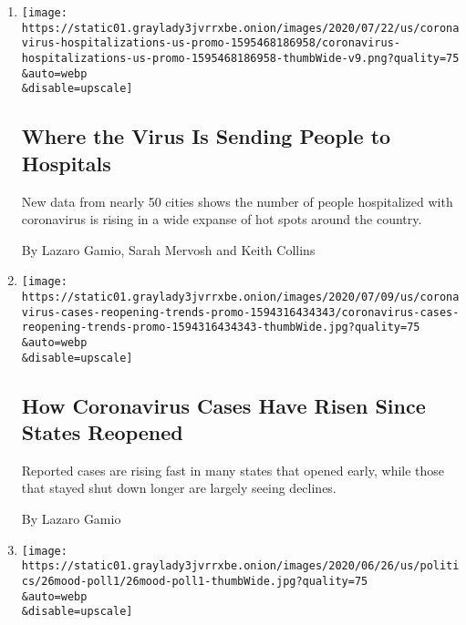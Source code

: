 \begin{enumerate}
\def\labelenumi{\arabic{enumi}.}
\item
  \href{/interactive/2020/07/23/us/coronavirus-hospitalizations-us.html}{}

  \texttt{[image: https://static01.graylady3jvrrxbe.onion/images/2020/07/22/us/coronavirus-hospitalizations-us-promo-1595468186958/coronavirus-hospitalizations-us-promo-1595468186958-thumbWide-v9.png?quality=75\\\&auto=webp\\\&disable=upscale]}

  \hypertarget{where-the-virus-is-sending-people-to-hospitals}{%
  \subsection{Where the Virus Is Sending People to
  Hospitals}\label{where-the-virus-is-sending-people-to-hospitals}}

  New data from nearly 50 cities shows the number of people hospitalized
  with coronavirus is rising in a wide expanse of hot spots around the
  country.

  By Lazaro Gamio, Sarah Mervosh and Keith Collins
\item
  \href{/interactive/2020/07/09/us/coronavirus-cases-reopening-trends.html}{}

  \texttt{[image: https://static01.graylady3jvrrxbe.onion/images/2020/07/09/us/coronavirus-cases-reopening-trends-promo-1594316434343/coronavirus-cases-reopening-trends-promo-1594316434343-thumbWide.jpg?quality=75\\\&auto=webp\\\&disable=upscale]}

  \hypertarget{how-coronavirus-cases-have-risen-since-states-reopened}{%
  \subsection{How Coronavirus Cases Have Risen Since States
  Reopened}\label{how-coronavirus-cases-have-risen-since-states-reopened}}

  Reported cases are rising fast in many states that opened early, while
  those that stayed shut down longer are largely seeing declines.

  By Lazaro Gamio
\item
  \href{/2020/06/27/us/politics/coronavirus-trump-mood-poll.html}{}

  \texttt{[image: https://static01.graylady3jvrrxbe.onion/images/2020/06/26/us/politics/26mood-poll1/26mood-poll1-thumbWide.jpg?quality=75\\\&auto=webp\\\&disable=upscale]}

  \hypertarget{how-americans-feel-about-the-country-right-now-anxious-hopeful}{%
}
\end{enumerate}
